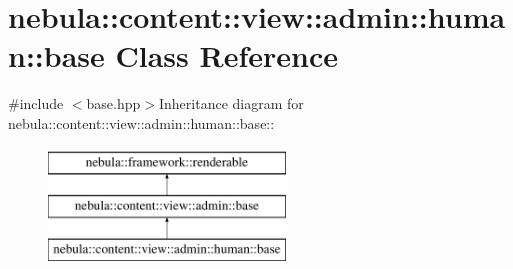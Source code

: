 \hypertarget{classnebula_1_1content_1_1view_1_1admin_1_1human_1_1base}{
\section{nebula::content::view::admin::human::base Class Reference}
\label{classnebula_1_1content_1_1view_1_1admin_1_1human_1_1base}
}


{\ttfamily \#include $<$base.hpp$>$}Inheritance diagram for nebula::content::view::admin::human::base::\begin{figure}[H]
\begin{center}
\leavevmode
\includegraphics[height=3cm]{classnebula_1_1content_1_1view_1_1admin_1_1human_1_1base}
\end{center}
\end{figure}
